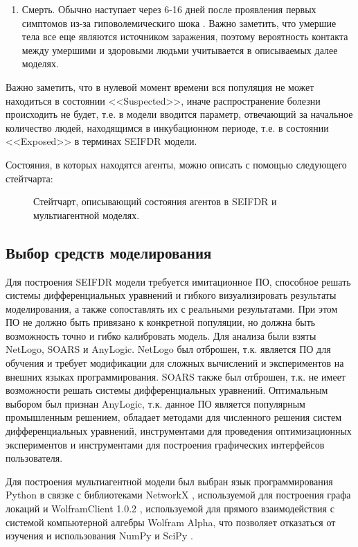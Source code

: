 \begin{enumerate}
	\item Смерть. Обычно наступает через 6-16 дней после проявления первых симптомов из-за гиповолемическиго шока \cite{MicroBio:2014}. %
	Важно заметить, что умершие тела все еще являются источником заражения, поэтому вероятность контакта между умершими и здоровыми людьми учитывается в описываемых далее моделях.
\end{enumerate}
Важно заметить, что в нулевой момент времени вся популяция не  может находиться в состоянии <<Suspected>>, иначе распространение болезни происходить не будет,  т.е. в модели вводится параметр, отвечающий за начальное количество людей, находящимся в инкубационном периоде,  т.е. в состоянии <<Exposed>>  в терминах SEIFDR модели.   

Состояния, в которых находятся агенты, можно описать с помощью следующего стейтчарта:
\begin{figure}
	\caption{Стейтчарт, описывающий состояния агентов в SEIFDR и мультиагентной моделях.}
\end{figure}
\subsection{Выбор средств моделирования}

Для построения SEIFDR модели требуется имитационное ПО, способное решать системы дифференциальных уравнений и гибкого визуализировать результаты моделирования, а также сопоставлять их с реальными результатами. При этом ПО не должно быть привязано к конкретной популяции, но должна быть возможность точно и гибко калибровать модель. Для анализа были взяты NetLogo, SOARS  и AnyLogic. NetLogo был отброшен,   т.к. является ПО для обучения и  требует модификации для сложных вычислений и экспериментов на внешних языках программирования. SOARS также был отброшен,   т.к. не имеет возможности решать системы дифференциальных уравнений. Оптимальным выбором был признан AnyLogic,  т.к. данное ПО является популярным промышленным решением, обладает методами для численного решения систем дифференциальных уравнений, инструментами для проведения оптимизационных экспериментов и инструментами для построения графических интерфейсов пользователя.


Для построения мультиагентной модели был выбран язык программирования Python в связке с библиотеками NetworkX %
\cite{NetworkX:git} , используемой для построения графа локаций 
и WolframClient 1.0.2 %
\cite{PiP:Wolfram}, используемой для прямого взаимодействия с системой компьютерной алгебры Wolfram Alpha, что позволяет отказаться от изучения и использования NumPy и SciPy %
.

